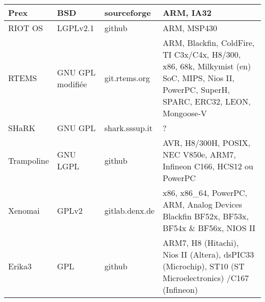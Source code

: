 \begin{tabular}{lllp{5.5cm}}
\hline
	Prex			&	BSD					&	sourceforge		&	{\footnotesize
																	ARM, IA32}	\\
\hline
	RIOT OS			&	LGPLv2.1			&	github			&	{\footnotesize
																	ARM, MSP430}\\
\hline
	RTEMS			&	GNU GPL modifiée	&	git.rtems.org	&	{\footnotesize
																	ARM, Blackfin,
																	ColdFire,
																	TI C3x/C4x,
																	H8/300, x86, 68k,
																	Milkymist (en)
																	SoC,
																	MIPS, Nios II,
																	PowerPC, SuperH,
																	SPARC, ERC32,
																	LEON,
																	Mongoose-V}	\\
\hline
	SHaRK			&	GNU GPL				&	shark.sssup.it	&	?	\\
\hline
	Trampoline		&	GNU LGPL			&	github			&	{\footnotesize
																	AVR, H8/300H,
																	POSIX, NEC V850e,
																	ARM7,
																	Infineon C166,
																	HCS12 ou
																	PowerPC	}	\\
\hline
	Xenomai			&	GPLv2				&	gitlab.denx.de	&	{\footnotesize
																	x86, x86\_64,
																	PowerPC, ARM,
																	Analog Devices
																	Blackfin BF52x,
																	BF53x,
																	BF54x \& BF56x,
																	NIOS II	}	\\
\hline
	Erika3			&	GPL					&	github			&	{\footnotesize
																	ARM7,
																	H8 (Hitachi),
																	Nios II (Altera),
																	dsPIC33
																	(Microchip),
																	ST10 (ST
																	Microelectronics)
																	/C167
																	(Infineon)}	\\ 
\bottomrule
\end{tabular}
